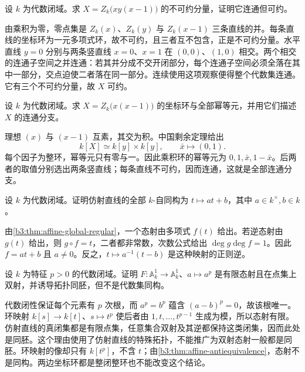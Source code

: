\begin{exercise}\label{b3:ex:07-three-lines}
	设 \(k\) 为代数闭域。求 \(X=Z_k\bigl(xy(x-1)\bigr)\) 的不可约分量，证明它连通但可约。
\end{exercise}
\begin{solution}
	由乘积为零，零点集是 \(Z_k(x)\)、\(Z_k(y)\) 与 \(Z_k(x-1)\) 三条直线的并。每条直线的坐标环为一元多项式环，故不可约，且三者互不包含，正是不可约分量。水平直线 \(y=0\) 分别与两条竖直线 \(x=0\)、\(x=1\) 在 \((0,0)\)、\((1,0)\) 相交。两个相交的连通子空间之并连通：若其并分成不交开闭部分，每个连通子空间必须全落在其中一部分，交点迫使二者落在同一部分。连续使用这项观察便得整个代数集连通。它有三个不可约分量，故 \(X\) 可约。
\end{solution}

\begin{exercise}\label{b3:ex:07-disjoint-lines}
	设 \(k\) 为代数闭域。求 \(X=Z_k\bigl(x(x-1)\bigr)\) 的坐标环与全部幂等元，并用它们描述 \(X\) 的连通分支。
\end{exercise}
\begin{solution}
	理想 \((x)\) 与 \((x-1)\) 互素，其交为积。中国剩余定理给出
	\[
		k[X]\simeq k[y]\times k[y],\qquad \bar x\longmapsto(0,1).
	\]
	每个因子为整环，幂等元只有零与一。因此乘积环的幂等元为 \(0,1,\bar x,1-\bar x\)。后两者的取值分别选出两条竖直线；每条直线不可约，因而连通，这就是全部连通分支。
\end{solution}

\begin{exercise}\label{b3:ex:07-line-automorphisms}
	设 \(k\) 为代数闭域。证明仿射直线的全部 \(k\)-自同构为 \(t\mapsto at+b\)，其中 \(a\in k^\times,b\in k\)。
\end{exercise}
\begin{solution}
	由\cref{b3:thm:affine-global-regular}，一个态射由多项式 \(f(t)\) 给出。若逆态射由 \(g(t)\) 给出，则 \(g\circ f=t\)，二者都非常数，次数公式给出 \(\deg g\deg f=1\)。因此 \(f=at+b\) 且 \(a\ne0\)。反之，\(t\mapsto a^{-1}(t-b)\) 是这种映射的正则逆。
\end{solution}

\begin{exercise}\label{b3:ex:07-frobenius-bijection}
	设 \(k\) 为特征 \(p>0\) 的代数闭域。证明 \(F:\mathbb A_k^1\to\mathbb A_k^1\)、\(a\mapsto a^p\) 是有限态射且在点集上双射，并诱导拓扑同胚，但不是代数集同构。
\end{exercise}
\begin{solution}
	代数闭性保证每个元素有 \(p\) 次根，而 \(a^p=b^p\) 蕴含 \((a-b)^p=0\)，故该根唯一。环映射 \(k[s]\to k[t]\)、\(s\mapsto t^p\) 使后者由 \(1,t,\ldots,t^{p-1}\) 生成为模，所以态射有限。仿射直线的真闭集都是有限点集，任意集合双射及其逆都保持这类闭集，因而此处是同胚。这个理由使用了仿射直线的特殊拓扑，不能推广为双射态射一般都是同胚。环映射的像却只有 \(k[t^p]\)，不含 \(t\)；由\cref{b3:thm:affine-antiequivalence}，态射不是同构。两边坐标环都是整闭整环也不能改变这个结论。
\end{solution}

